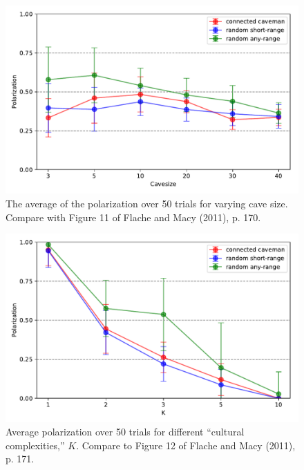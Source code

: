 \documentclass[11pt,letterpaper]{article}
\begin{document}
\begin{figure}
\begin{center}
  \includegraphics[width=\textwidth]{Figures/figure11b.pdf}
\end{center}
  \caption{The average of the polarization over 50 trials for varying cave size.
    Compare with Figure 11 of Flache and Macy (2011), p. 170.}
\label{fig:figure11-reproduction}
\end{figure}

\begin{figure}
\begin{center}
  \includegraphics[width=\textwidth]{Figures/figure12b.pdf}
\end{center}
  \caption{Average polarization over 50 trials for different 
    ``cultural complexities,'' $K$. Compare to Figure 12 of Flache and Macy
    (2011), p. 171.}
\label{fig:figure12-reproduction}
\end{figure}





\setlength{\bibleftmargin}{.125in}
\setlength{\bibindent}{-\bibleftmargin}


\end{document}
